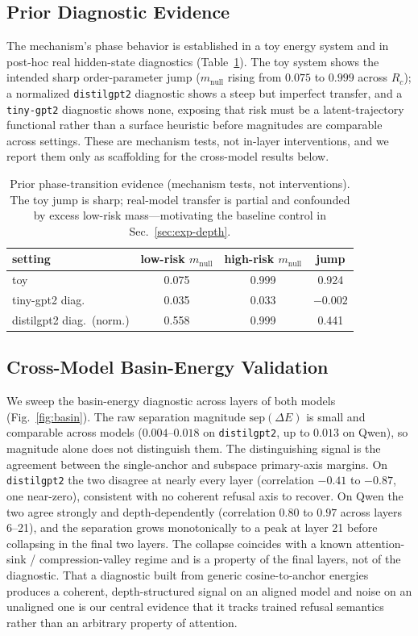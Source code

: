 \documentclass[letterpaper]{article} %
\begin{document}
\subsection{Prior Diagnostic Evidence}
\label{sec:exp-prior}
The mechanism's phase behavior is established in a toy energy system and in post-hoc real
hidden-state diagnostics (Table~\ref{tab:prior}). The toy system shows the intended sharp
order-parameter jump ($m_{\text{null}}$ rising from $0.075$ to $0.999$ across $R_c$); a normalized
\texttt{distilgpt2} diagnostic shows a steep but imperfect transfer, and a \texttt{tiny-gpt2}
diagnostic shows none, exposing that risk must be a latent-trajectory functional rather than a
surface heuristic before magnitudes are comparable across settings. These are mechanism tests, not
in-layer interventions, and we report them only as scaffolding for the cross-model results below.

\begin{table}[t]
\centering
\begin{tabular}{lccc}
\toprule
setting & low-risk $m_{\text{null}}$ & high-risk $m_{\text{null}}$ & jump \\
\midrule
toy                       & 0.075 & 0.999 & 0.924 \\
tiny-gpt2 diag.\          & 0.035 & 0.033 & $-0.002$ \\
distilgpt2 diag.\ (norm.) & 0.558 & 0.999 & 0.441 \\
\bottomrule
\end{tabular}
\caption{Prior phase-transition evidence (mechanism tests, not interventions). The toy jump is
sharp; real-model transfer is partial and confounded by excess low-risk mass---motivating the
baseline control in Sec.~\ref{sec:exp-depth}.}
\label{tab:prior}
\end{table}

\subsection{Cross-Model Basin-Energy Validation}
\label{sec:exp-basin}
We sweep the basin-energy diagnostic across layers of both models
(Fig.~\ref{fig:basin}). The raw separation magnitude $\mathrm{sep}(\Delta E)$ is small and
comparable across models ($0.004$--$0.018$ on \texttt{distilgpt2}, up to $0.013$ on Qwen), so
magnitude alone does not distinguish them. The distinguishing signal is the agreement between the
single-anchor and subspace primary-axis margins. On \texttt{distilgpt2} the two disagree at nearly
every layer (correlation $-0.41$ to $-0.87$, one near-zero), consistent with no coherent refusal
axis to recover. On Qwen the two agree strongly and depth-dependently (correlation $0.80$ to
$0.97$ across layers 6--21), and the separation grows monotonically to a peak at layer 21 before
collapsing in the final two layers. The collapse coincides with a known attention-sink /
compression-valley regime \citep{attentionSinkEmerges2025,compressionValleys2025} and is a
property of the final layers, not of the diagnostic. That a diagnostic built from generic
cosine-to-anchor energies produces a coherent, depth-structured signal on an aligned model and
noise on an unaligned one is our central evidence that it tracks trained refusal semantics rather
than an arbitrary property of attention.
\end{document}
